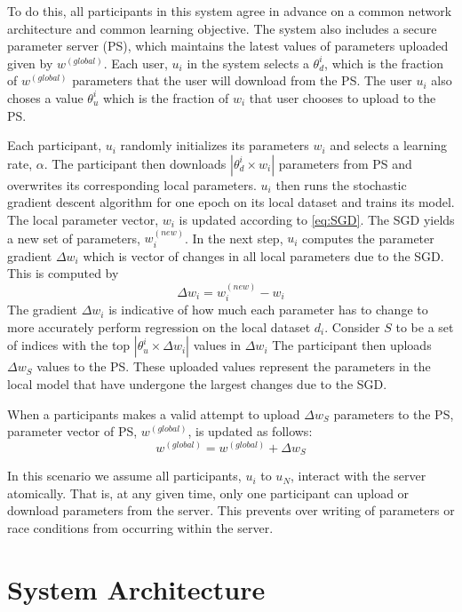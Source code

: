\documentclass[conference]{IEEEtran}
\begin{document}
To do this, all participants in this system agree in advance on a
common network architecture and common learning objective. The system also includes a secure parameter server (PS), which maintains the
latest values of parameters uploaded given by $w^{(global)}$. Each user, $u_i$ in the system selects a $\theta_d^{i}$, which is the fraction of  $w^{(global)}$ parameters that the user will download from the PS. 
The user $u_i$ also choses a value $\theta_u^{i}$ which is the fraction of $w_i$ that user chooses to upload to the PS.

Each participant, $u_i$ randomly initializes its parameters $w_i$ and selects a learning rate, $\alpha$.
The participant then downloads $|\theta_d^{i} \times w_i|$ parameters from PS and overwrites its corresponding local parameters.
$u_i$ then runs the stochastic gradient descent algorithm for one epoch on its local dataset and trains its model. The local parameter vector, $w_i$ is updated according to \eqref{eq:SGD}. The SGD yields a new set of parameters, $w_i^{(new)}$.
In the next step, $u_i$ computes the parameter gradient $\Delta w_i$ which is vector of changes in all local parameters due to the SGD. This is computed by
$$\Delta w_i =  w_i^{(new)} -  w_i$$ 
The gradient  $\Delta w_i$ is indicative of how much each parameter has to change to more accurately perform regression on the local dataset $d_i$.
Consider $S$ to be a set of indices with the top  $|\theta_u^{i} \times \Delta w_i|$ values in $\Delta w_i$ 
The participant then uploads  $\Delta w_S$ values to the PS.
These uploaded values represent the parameters in the local model that have undergone the largest changes due to the SGD. 

When a participants makes a valid attempt to upload $\Delta w_S$ parameters to the PS, parameter vector of PS,  $w^{(global)}$, is updated as follows:
$$w^{(global)} =  w^{(global)} +  \Delta w_S$$

In this scenario we assume all participants, $u_i$ to $u_N$, interact with the server atomically.
That is, at any given time, only one participant can upload or download parameters from the server. This prevents over writing of parameters or race conditions from occurring within the server.

\section{System Architecture}
\end{document}
